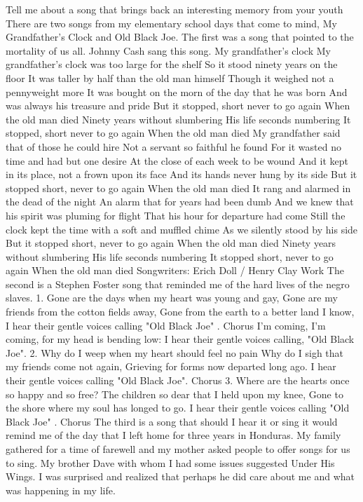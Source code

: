 
Tell me about a song that brings back an interesting memory from your youth
There are two songs from my elementary school days that come to mind, My Grandfather's Clock and Old Black Joe. The first was a song that pointed to the mortality of us all. Johnny Cash sang this song.
My grandfather's clock
My grandfather's clock was too large for the shelf
So it stood ninety years on the floor
It was taller by half than the old man himself
Though it weighed not a pennyweight more
It was bought on the morn of the day that he was born
And was always his treasure and pride
But it stopped, short never to go again
When the old man died
Ninety years without slumbering
His life seconds numbering
It stopped, short never to go again
When the old man died
My grandfather said that of those he could hire
Not a servant so faithful he found
For it wasted no time and had but one desire
At the close of each week to be wound
And it kept in its place, not a frown upon its face
And its hands never hung by its side
But it stopped short, never to go again
When the old man died
It rang and alarmed in the dead of the night
An alarm that for years had been dumb
And we knew that his spirit was pluming for flight
That his hour for departure had come
Still the clock kept the time with a soft and muffled chime
As we silently stood by his side
But it stopped short, never to go again
When the old man died
Ninety years without slumbering
His life seconds numbering
It stopped short, never to go again
When the old man died
Songwriters: Erich Doll / Henry Clay Work
The second is a Stephen Foster song that reminded me of the hard lives of the negro slaves.
1. Gone are the days when my heart was young and gay, Gone are my friends from the cotton fields away, Gone from the earth to a better land I know, I hear their gentle voices calling "Old Black Joe" . 
Chorus I'm coming, I'm coming, for my head is bending low: I hear their gentle voices calling, "Old Black Joe". 
2. Why do I weep when my heart should feel no pain Why do I sigh that my friends come not again, Grieving for forms now departed long ago. I hear their gentle voices calling "Old Black Joe". Chorus 
3. Where are the hearts once so happy and so free? The children so dear that I held upon my knee, Gone to the shore where my soul has longed to go. I hear their gentle voices calling "Old Black Joe" . Chorus
The third is a song that should I hear it or sing it would remind me of the day that I left home for three years in Honduras. My family gathered for a time of farewell and my mother asked people to offer songs for us to sing. My brother Dave with whom I had some issues suggested Under His Wings. I was surprised and realized that perhaps he did care about me and what was happening in my life. 
